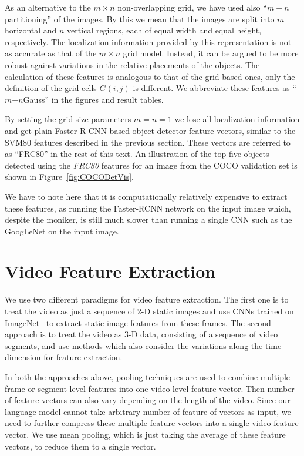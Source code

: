 As an alternative to the $m\times n$ non-overlapping grid, we have used also
``$m+n$ partitioning'' of the images.
By this we mean that the images are split into $m$ horizontal and $n$ vertical
regions, each of equal width and equal height, respectively.
The localization information provided by this representation is not as accurate
as that of the $m\times n$ grid model.
Instead, it can be argued to be more robust against variations in the relative
placements of the objects.
The calculation of these features is analogous to that of the grid-based ones,
only the definition of the grid cells $G(i,j)$ is different.
We abbreviate these features as ``$m$+$n$Gauss'' in the figures and result
tables.

By setting the grid size parameters $m=n=1$ we lose all localization information
and get plain Faster R-CNN based object detector feature vectors, similar to the SVM80
features described in the previous section.
These vectors are referred to as ``FRC80'' in the rest of this text. 
An illustration of the top five objects detected using the \emph{FRC80} features
for an image from the COCO validation set is shown in
Figure~\ref{fig:COCODetVis}.

We have to note here that it is computationally relatively expensive to extract
these features, as  running the Faster-RCNN network on the input image which,
despite the moniker, is still much slower than running a single CNN such as the
GoogLeNet on the input image.

\section{Video Feature Extraction}
\label{sec:VideoFeat}
We use two different paradigms for video feature extraction.
The first one is to treat the video as just a sequence of 2-D static images and
use CNNs trained on ImageNet~\cite{ImagenetOrig} to extract static image
features from these frames.
The second approach is to treat the video as 3-D data, consisting of a
sequence of video segments, and use methods which also consider the variations
along the time dimension for feature extraction.

In both the approaches above, pooling techniques are used to combine multiple
frame or segment level features into one video-level feature vector.
Then number of feature vectors can also vary depending on the length of the
video.
Since our language model cannot take arbitrary number of feature of vectors as
input, we need to further compress these multiple feature vectors into a single
video feature vector. 
We use mean pooling, which is just taking the average of these feature vectors,
to reduce them to a single vector.

